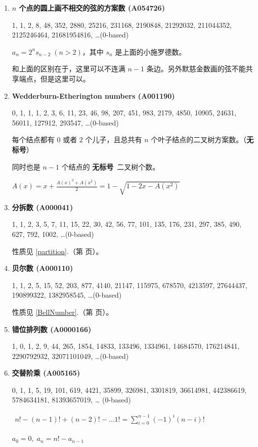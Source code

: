 \documentclass[a4paper, twoside]{article}
\newcommand\detailedref[1]{\ref{#1}.\nameref{#1}（第 \pageref{#1} 页）}
\begin{document}
\begin{enumerate}
        \item \textbf{$n$ 个点的圆上画不相交的弦的方案数 (A054726)}
        \label{A054726}

        1, 1, 2, 8, 48, 352, 2880, 25216, 231168, 2190848, 21292032, 211044352, 2125246464, 21681954816, \dots \;(0-based)

        $ a_n = 2^n s_{n - 2} \; (n > 2) $，其中 $s_n$ 是上面的小施罗德数。

        和上面的区别在于，这里可以不连满 $n-1$ 条边。另外默慈金数画的弦不能共享端点，但是这里可以。

        \item \textbf{Wedderburn-Etherington numbers (A001190)}

        0, 1, 1, 1, 2, 3, 6, 11, 23, 46, 98, 207, 451, 983, 2179, 4850, 10905, 24631, 56011, 127912, 293547, \dots \;(0-based)

        每个结点都有 $0$ 或者 $2$ 个儿子，且总共有 $n$ 个叶子结点的二叉树方案数。（\textbf{无标号}）

        同时也是 $n-1$ 个结点的 \textbf{无标号}\ 二叉树个数。

        $ A(x) = x + \frac {A(x) ^ 2 + A(x ^ 2)} 2 = 1 - \sqrt{1 - 2x - A(x ^ 2)} $

        \item \textbf{分拆数 (A000041)}

        1, 1, 2, 3, 5, 7, 11, 15, 22, 30, 42, 56, 77, 101, 135, 176, 231, 297, 385, 490, 627, 792, 1002, \dots \;(0-based)

        性质见 \detailedref{partition}。

        \item \textbf{贝尔数 (A000110)}

        1, 1, 2, 5, 15, 52, 203, 877, 4140, 21147, 115975, 678570, 4213597, 27644437, 190899322, 1382958545, \dots \;(0-based)

        性质见 \detailedref{BellNumber}。

        \item \textbf{错位排列数 (A0000166)}

        1, 0, 1, 2, 9, 44, 265, 1854, 14833, 133496, 1334961, 14684570, 176214841, 2290792932, 32071101049, \dots \;(0-based)

        \item \textbf{交替阶乘 (A005165)}

        0, 1, 1, 5, 19, 101, 619, 4421, 35899, 326981, 3301819, 36614981, 442386619, 5784634181, 81393657019, \dots \; (0-based)

        $ \begin{aligned} n! - (n - 1)! + (n - 2)! - \dots 1! = \sum_{i = 0} ^ {n - 1} (-1)^i (n - i)! \end{aligned} $

        $ a_0 = 0,\; a_n = n! - a_{n - 1} $

        \end{enumerate}
\end{document}
